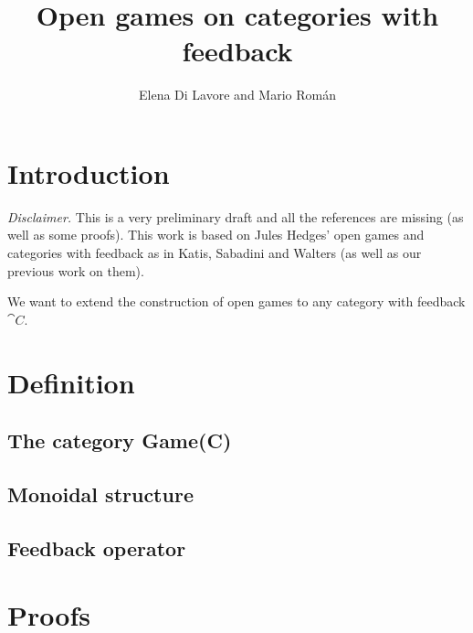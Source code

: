 \documentclass{article}
\title{Open games on categories with feedback}
\author{Elena Di Lavore and Mario Rom\'an}
\begin{document}
\maketitle
\section{Introduction}
\emph{Disclaimer.} This is a very preliminary draft and all the references are missing (as well as some proofs). This work is based on Jules Hedges' open games and categories with feedback as in Katis, Sabadini and Walters (as well as our previous work on them).

We want to extend the construction of open games to any category with feedback \(\cat{C}\).
\section{Definition}
\subsection{The category Game(C)}

\subsection{Monoidal structure}

\subsection{Feedback operator}

\appendix
\section{Proofs}


%
\end{document}
